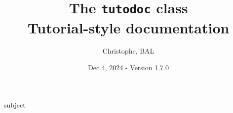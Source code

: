   {subject }


\newcommand{\FTdirO}{}
\def\FTdirO(#1,#2,#3){%
  \FTfile(#1,{\color{blue!40!black}\faFolderOpen\hspace{-.35pt}}{\hspace{0.2em}#3})
  (tmp.west)++(0.8em,-0.4em)node(#2){}
  (tmp.west)++(1.5em,0)
  ++(0,-1.3em)
}

\newcommand{\FTdirC}{}
\def\FTdirC(#1,#2,#3){%
  \FTfile(#1,{\color{blue!40!black}\faFolder\hspace{.75pt}}{\hspace{0.2em}#3})
  (tmp.west)++(0.8em,-0.4em)node(#2){}
  (tmp.west)++(1.5em,0)
  ++(0,-1.3em)
}

\newcommand{\FTfile}{}
\def\FTfile(#1,#2){%
  node(tmp){}
  (#1|-tmp)++(0.6em,0)
  node(tmp)[anchor=west,black]{\texttt{#2}}
  (#1)|-(tmp.west)
  ++(0,-1.2em)
}

\newcommand{\FTroot}{}
\def\FTroot{tmp.west}

\newcommand\contribtranslatedirtree{
  \begin{tikzpicture}%
    \draw[color=black, thick]
      \FTdirO(\FTroot,root,translate){
        \FTdirC(root,changes,changes){
        }
        \FTdirO(root,en,en) {
          \FTdirC(en,api,api) {
          }
          \FTdirC(en,doc,doc) {
          }
        }
        \FTdirC(root,fr,fr){
        }
        \FTdirC(root,status,status){
          \FTdirO(status,en,en) {
            \FTfile(en,api.yaml)
            \FTfile(en,manual.yaml)
          }
          \FTdirC(status,fr,fr){
          }
        }
        \FTfile(root,README.md)
        \FTfile(root,LICENSE.txt)
      };
  \end{tikzpicture}
}





\title{The \texttt{tutodoc} class \\ Tutorial-style documentation}
\author{Christophe, BAL}
\date{Dec 4, 2024 - Version 1.7.0}

\maketitle

